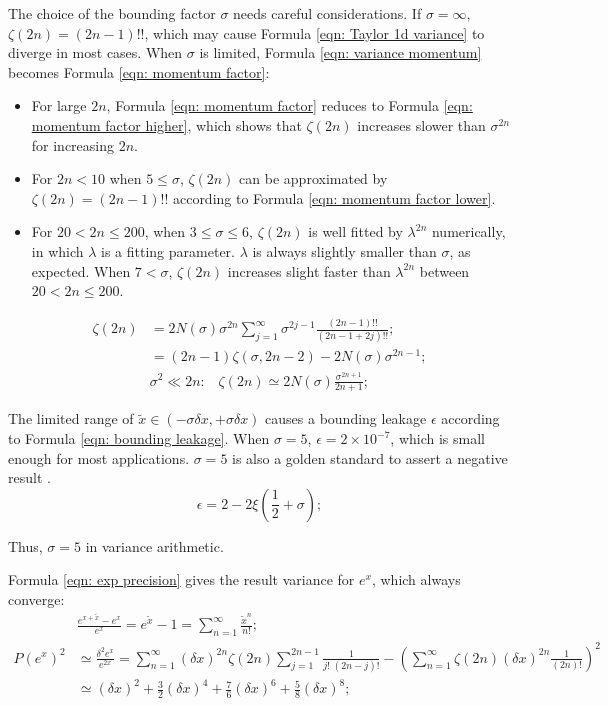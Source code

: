 \documentclass[twoside]{article}
\numberwithin{equation}{section}
\newcommand{\eqspace}{\;\;\;}
\begin{document}
The choice of the bounding factor $\sigma$ needs careful considerations.
If $\sigma = \infty$, $\zeta(2n) = (2n - 1)!!$, which may cause Formula \eqref{eqn: Taylor 1d variance} to diverge in most cases.
When $\sigma$ is limited, Formula \eqref{eqn: variance momentum} becomes Formula \eqref{eqn: momentum factor}:
\begin{itemize}
\item For large $2n$, Formula \eqref{eqn: momentum factor} reduces to Formula \eqref{eqn: momentum factor higher}, which shows that $\zeta(2n)$ increases slower than $\sigma^{2n}$ for increasing $2n$.

\item For $2n < 10$ when $5 \leq \sigma$, $\zeta(2n)$ can be approximated by $\zeta(2n) = (2n-1)!!$ according to Formula \eqref{eqn: momentum factor lower}.  

\item For $20 < 2n \leq 200$, when $3 \leq \sigma \leq 6$, $\zeta(2n)$ is well fitted by $\lambda^{2n}$ numerically, in which $\lambda$ is a fitting parameter. 
$\lambda$ is always slightly smaller than $\sigma$, as expected.
When $7 < \sigma$, $\zeta(2n)$ increases slight faster than $\lambda^{2n}$ between $20 < 2n \leq 200$.
\end{itemize}
\begin{align}
\label{eqn: momentum factor} 
\zeta(2n) &= 2 N(\sigma) \sigma^{2n} \sum_{j=1}^{\infty} \sigma^{2j-1} \frac{(2n - 1)!!}{(2n-1 + 2j)!!}; \\
\label{eqn: momentum factor lower} 
 &= (2n - 1) \zeta(\sigma, 2n - 2) - 2 N(\sigma) \sigma^{2n - 1}; \\
\label{eqn: momentum factor higher} 
&\sigma^2 \ll 2n:\eqspace \zeta(2n) \simeq 2 N(\sigma) \frac{\sigma^{2n+1}}{2n+1};
\end{align}

The limited range of $\tilde{x} \in (-\sigma \delta x, +\sigma \delta x)$ causes a bounding leakage $\epsilon$ according to Formula \eqref{eqn: bounding leakage}.
When $\sigma = 5$, $\epsilon = 2 \times 10^{-7}$, which is small enough for most applications.
$\sigma = 5$ is also a golden standard to assert a negative result \cite{Precisions_Physical_Measurements}.
\begin{equation}
\label{eqn: bounding leakage}
\epsilon = 2 - 2 \xi(\frac{1}{2} + \sigma);
\end{equation}

Thus, $\sigma = 5$ in variance arithmetic.

Formula \eqref{eqn: exp precision} gives the result variance for $e^x$, which always converge:
\begin{align}
\label{eqn: exp Taylor}
&\frac{e^{x + \tilde{x}} - e^x}{e^x} = e^{\tilde{x}} - 1 = \sum_{n=1}^{\infty} \frac{\tilde{x}^n}{n!}; \\
\label{eqn: exp precision}
P(e^x)^2 &\simeq \frac{\delta^2 e^x}{e^{2x}} = \sum_{n=1}^{\infty} (\delta x)^{2n} \zeta(2n) \sum_{j=1}^{2n-1} \frac{1}{j!\;(2n - j)!}
 - \left( \sum_{n=1}^{\infty} \zeta(2n) (\delta x)^{2n} \frac{1}{(2n)!} \right)^2 \\
 &\simeq (\delta x)^2 + \frac{3}{2} (\delta x)^4 + \frac{7}{6} (\delta x)^6 + \frac{5}{8} (\delta x)^8;
\end{align}
\end{document}
